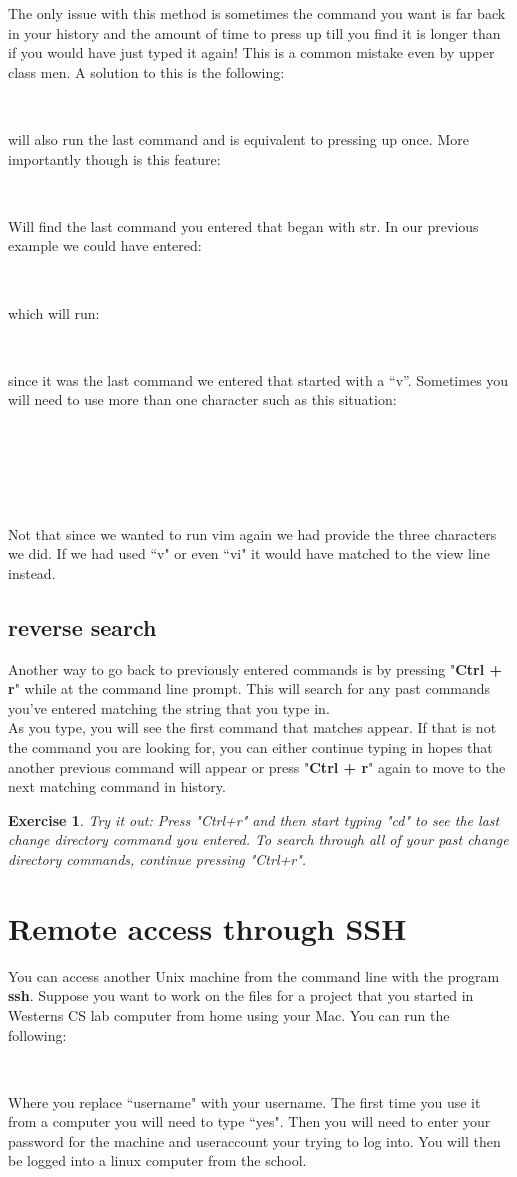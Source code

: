 \documentclass[oneside]{book}
\newcommand{\commandline}[1]{\begin{center} \colorbox{Dark}{\textcolor{white}{#1}} \end{center}}
\newtheorem{ex}{Exercise}[chapter]
\begin{document}
The only issue with this method is sometimes the command you want is far back in your history and the amount of time to press up till you find it is longer than if you would have just typed it again! This is a common mistake even by upper class men. A solution to this is the following:
\commandline{!!}
will also run the last command and is equivalent to pressing up once. More importantly though is this feature:
\commandline{!str}
Will find the last command you entered that began with str. In our previous example we could have entered:
\commandline{!v}
which will run:
\commandline{vim HelloWorld.c}
since it was the last command we entered that started with a ``v''. Sometimes you will need to use more than one character such as this situation:
\commandline{vim HelloWorld.c}
\commandline{view HelloWorld.c}
\commandline{!vim}
Not that since we wanted to run vim again we had provide the three characters we did. If we had used ``v" or even ``vi" it would have matched to the view line instead.

\subsection{reverse search}
Another way to go back to previously entered commands is by pressing "\textbf{Ctrl + r}" while at the command line prompt.  This will search for any past commands you've entered matching the string that you type in.  \\
As you type, you will see the first command that matches appear.  If that is not the command you are looking for, you can either continue typing in hopes that another previous command will appear or press "\textbf{Ctrl + r}" again to move to the next matching command in history.
\begin{ex}
Try it out: Press "Ctrl+r" and then start typing "cd" to see the last change directory command you entered. To search through all of your past change directory commands, continue pressing "Ctrl+r". 
\end{ex}

\section{Remote access through SSH}
    You can access another Unix machine from the command line with the program \textbf{ssh}. Suppose you want to work on the files for a project that you started in Westerns CS lab computer from home using your Mac. You can run the following:
    \commandline{ssh -p 922 username@linux.cs.wwu.edu}
    Where you replace ``username" with your username. The first time you use it from a computer you will need to type ``yes". Then you will need to enter your password for the machine and useraccount your trying to log into. You will then be logged into a linux computer from the school.
    
\end{document}
